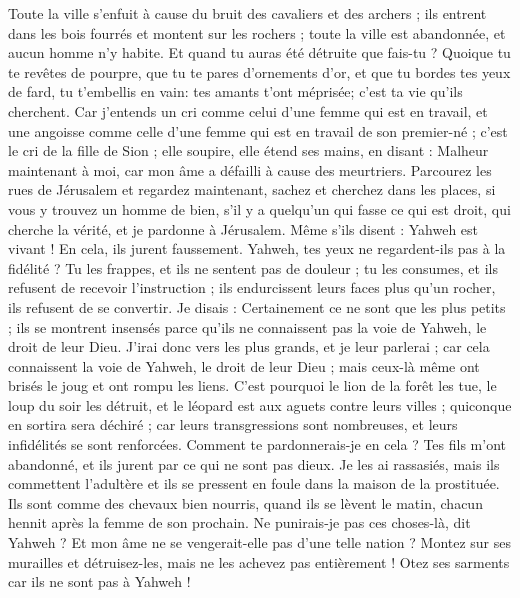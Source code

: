 \begin{multicols}{2}
Toute la ville s'enfuit à cause du bruit des cavaliers et des archers ; ils entrent dans les bois fourrés et montent sur les rochers ; toute la ville est abandonnée, et aucun homme n'y habite.
Et quand tu auras été détruite que fais-tu ? Quoique tu te revêtes de pourpre, que tu te pares d'ornements d'or, et que tu bordes tes yeux de fard, tu t'embellis en vain: tes amants t'ont méprisée; c'est ta vie qu'ils cherchent.
Car j'entends un cri comme celui d'une femme qui est en travail, et une angoisse comme celle d'une femme qui est en travail de son premier-né ; c'est le cri de la fille de Sion ; elle soupire, elle étend ses mains, en disant : Malheur maintenant à moi, car mon âme a défailli à cause des meurtriers. 
\VerseOne{}Parcourez les rues de Jérusalem et regardez maintenant, sachez et cherchez dans les places, si vous y trouvez un homme de bien, s'il y a quelqu'un qui fasse ce qui est droit, qui cherche la vérité, et je pardonne à Jérusalem.
Même s'ils disent : Yahweh est vivant ! En cela, ils jurent faussement.
Yahweh, tes yeux ne regardent-ils pas à la fidélité ? Tu les frappes, et ils ne sentent pas de douleur ; tu les consumes, et ils refusent de recevoir l'instruction ; ils endurcissent leurs faces plus qu'un rocher, ils refusent de se convertir.
Je disais : Certainement ce ne sont que les plus petits ; ils se montrent insensés parce qu'ils ne connaissent pas la voie de Yahweh, le droit de leur Dieu.
J'irai donc vers les plus grands, et je leur parlerai ; car cela connaissent la voie de Yahweh, le droit de leur Dieu ; mais ceux-là même ont brisés le joug et ont rompu les liens.
C'est pourquoi le lion de la forêt les tue, le loup du soir les détruit, et le léopard est aux aguets contre leurs villes ; quiconque en sortira sera déchiré ; car leurs transgressions sont nombreuses, et leurs infidélités se sont renforcées.
Comment te pardonnerais-je en cela ? Tes fils m'ont abandonné, et ils jurent par ce qui ne sont pas dieux. Je les ai rassasiés, mais ils commettent l'adultère et ils se pressent en foule dans la maison de la prostituée.
Ils sont comme des chevaux bien nourris, quand ils se lèvent le matin, chacun hennit après la femme de son prochain.
Ne punirais-je pas ces choses-là, dit Yahweh ? Et mon âme ne se vengerait-elle pas d'une telle nation ?
Montez sur ses murailles et détruisez-les, mais ne les achevez pas entièrement ! Otez ses sarments car ils ne sont pas à Yahweh !

\end{multicols}
